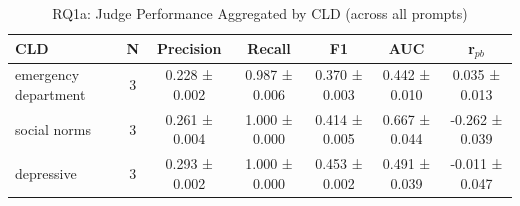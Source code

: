 \begin{table}[htbp]
\centreing
\caption{RQ1a: Judge Performance Aggregated by CLD (across all prompts)}
\label{tab:rq1a_by_cld}
\begin{tabular}{lcccccc}
\toprule
\textbf{CLD} & \textbf{N} & \textbf{Precision} & \textbf{Recall} & \textbf{F1} & \textbf{AUC} & \textbf{r$_{pb}$} \\
\midrule
emergency department & 3 & 0.228 ± 0.002 & 0.987 ± 0.006 & 0.370 ± 0.003 & 0.442 ± 0.010 & 0.035 ± 0.013 \\
social norms & 3 & 0.261 ± 0.004 & 1.000 ± 0.000 & 0.414 ± 0.005 & 0.667 ± 0.044 & -0.262 ± 0.039 \\
depressive & 3 & 0.293 ± 0.002 & 1.000 ± 0.000 & 0.453 ± 0.002 & 0.491 ± 0.039 & -0.011 ± 0.047 \\
\bottomrule
\end{tabular}
\end{table}